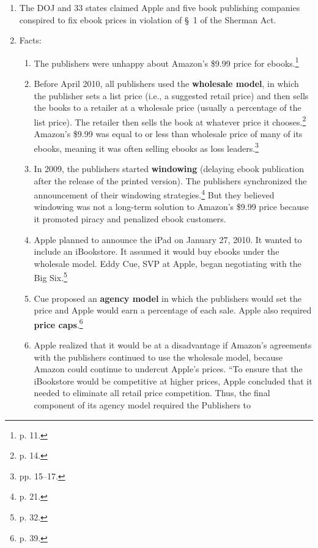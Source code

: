\begin{enumerate}
    \item The DOJ and 33 states claimed Apple and five book publishing 
    companies conspired to fix ebook prices in violation of \S\ 1 of the 
    Sherman Act.
    \item Facts:
    \begin{enumerate}
        \item The publishers were unhappy about Amazon's \$9.99 price for 
        ebooks.\footnote{p. 11.}
        \item Before April 2010, all publishers used the \textbf{wholesale  
        model}, in which the publisher sets a list price (i.e., a suggested 
        retail price) and then sells the books to a retailer at a wholesale 
        price (usually a percentage of the list price). The retailer then sells 
        the book at whatever price it chooses.\footnote{p. 14.} Amazon's \$9.99 
        was equal to or less than wholesale price of many of its ebooks, meaning 
        it was often selling ebooks as loss leaders.\footnote{pp. 15--17.}
        \item In 2009, the publishers started \textbf{windowing} (delaying ebook 
        publication after the release of the printed version). The publishers 
        synchronized the announcement of their windowing strategies.\footnote{p. 
        21.} But they believed windowing was not a long-term solution to 
        Amazon's \$9.99 price because it promoted piracy and penalized ebook 
        customers.
        \item Apple planned to announce the iPad on January 27, 2010. It wanted 
        to include an iBookstore. It assumed it would buy ebooks under the 
        wholesale model. Eddy Cue, SVP at Apple, began negotiating with the Big 
        Six.\footnote{p. 32.}
        \item Cue proposed an \textbf{agency model} in which the publishers 
        would set the price and Apple would earn a percentage of each sale. 
        Apple also required \textbf{price caps}.\footnote{p. 39.}
        \item Apple realized that it would be at a disadvantage if Amazon's 
        agreements with the publishers continued to use the wholesale model, 
        because Amazon could continue to undercut Apple's prices.  ``To ensure 
        that the iBookstore would be competitive at higher prices, Apple 
        concluded that it needed to eliminate all retail price competition. 
        Thus, the final component of its agency model required the Publishers to 

\end{enumerate}
\end{enumerate}
